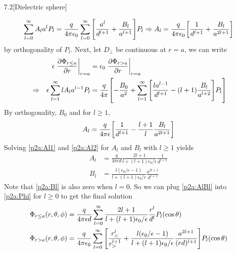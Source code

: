 \documentclass[12pt]{article}
\begin{document}
\begin{problem}{7.2}[Dielectric sphere]
\begin{solution}
\begin{equation}
    \sum_{l=0}^\infty A_la^l
    P_l=\frac{q}{4\pi\epsilon_0}\sum_{l=0}^\infty\qty[\frac{a^l}{d^{l+1}}+\frac{B_l}{a^{l+1}}]P_l\Rightarrow
    A_l=\frac{q}{4\pi\epsilon_0}\qty[\frac1{d^{l+1}}+\frac{B_l}{a^{2l+1}}]
\end{equation}
by orthogonality of $P_l$. Next, let $D_\bot$ be continuous at $r=a$, we can
write
\begin{align}
    &&\epsilon\eval{\frac{\partial\Phi_{r\leq a}}{\partial r}}_{r=a}
    &=\epsilon_0\eval{\frac{\partial\Phi_{r>a}}{\partial r}}_{r=a}\notag\\
    &\Rightarrow&
    \epsilon\sum_{l=1}^\infty lA_la^{l-1}P_l&=\frac{q}{4\pi}
    \qty[-\frac{B_0}{a^2}+\sum_{l=1}^\infty\qty[\frac{la^{l-1}}{d^{l+1}}-(l+1)\frac{B_l}{a^{l+2}}]P_l]
\end{align}
By orthogonality, $B_0$ and for $l\geq 1$,
\begin{equation}\label{p2a:Al2}
    A_l=\frac{q}{4\pi\epsilon}\qty[\frac1{d^{l+1}}-\frac{l+1}{l}\frac{B_l}{a^{2l+1}}] 
\end{equation}
Solving \eqref{p2a:Al1} and \eqref{p2a:Al2} for $A_l$ and $B_l$ with
$l\geq 1$ yields
\begin{subequations}\label{p2a:AlBl}
    \begin{align}
        A_l
        &=\frac{q}{4\pi\epsilon
        d}\frac{2l+1}{l+(l+1)\epsilon_0/\epsilon}\frac1{d^{l+1}}\\
        B_l
        &=\frac{l(\epsilon_0/\epsilon-1)}{l+(l+1)\epsilon_0/\epsilon}\frac{a^{2l+1}}{d^{l+1}}\label{p2a:Bl}
    \end{align} 
\end{subequations}
Note that \eqref{p2a:Bl} is also zero when $l=0$. So we can plug
\eqref{p2a:AlBl} into \eqref{p2a:Phi} for $l\geq 0$ to get the final solution
\begin{subequations}
    \begin{align}
        \Phi_{r\leq a}(r,\theta,\phi)&=
        \frac{q}{4\pi\epsilon
        d}\sum_{l=0}^\infty\frac{2l+1}{l+(l+1)\epsilon_0/\epsilon}\frac{r^l}{d^l}P_l(\cos\theta)\label{p2a:Phi_m}\\
        \Phi_{r>a}(r,\theta,\phi)&=
        \frac{q}{4\pi\epsilon_0}\sum_{l=0}^\infty\qty[
        \frac{r_<^l}{r_>^{l+1}}+\frac{l(\epsilon_0/\epsilon-1)}{l+(l+1)\epsilon_0/\epsilon}\frac{a^{2l+1}}{(rd)^{l+1}}
        ]P_l(\cos\theta)\label{p2a:Phi_p}
    \end{align} 
\end{subequations}


\end{solution}
\end{problem}
\end{document}
